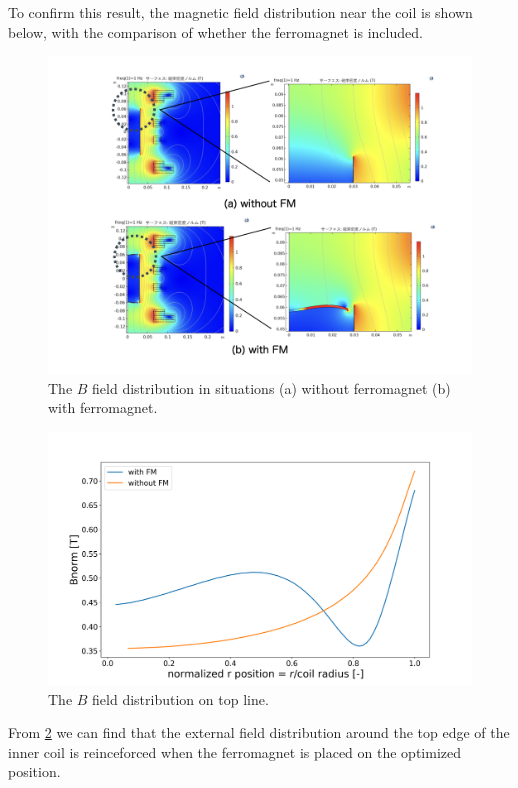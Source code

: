 To confirm this result, the magnetic field distribution near the coil is shown below,
with the comparison of whether the ferromagnet is included.
\begin{figure}[H]
  \includegraphics[width=18cm, bb=9 9 900 550]{./section4Optimal/FMDistribution.png}
  \caption{The $B$ field distribution in situations (a) without ferromagnet (b) with ferromagnet.}
  \label{fig:FMDistribution}
\end{figure}
\begin{figure}[H]
  \includegraphics[width=18cm, bb=9 9 900 550]{./section4Optimal/FMDistributionTopLine.png}
  \caption{The $B$ field distribution on top line.}
  \label{fig:FMDistribution}
\end{figure}
From \ref{fig:FMDistribution} we can find that the external field distribution around the top edge of the inner coil is reinceforced when the ferromagnet is placed on the optimized position.

